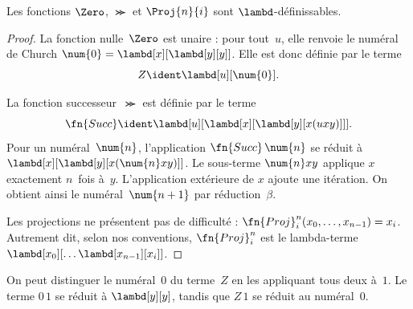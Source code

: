\documentclass[../../../include/open-logic-section]{subfiles}
\begin{document}

\begin{lem}
Les fonctions $\Zero$, $\Succ$ et $\Proj{n}{i}$ sont
$\lambd$-définissables.
\end{lem}

\begin{proof}
La fonction nulle~$\Zero$ est unaire : pour tout~$u$,
elle renvoie le numéral de Church
$\num{0}=\lambd[x][\lambd[y][y]]$.
Elle est donc définie par le terme
\[
Z\ident\lambd[u][\num{0}].
\]

La fonction successeur~$\Succ$ est définie par le terme
\[
\fn{Succ}\ident\lambd[u][\lambd[x][\lambd[y][x(uxy)]]].
\]
Pour un numéral~$\num{n}$, l'application
$\fn{Succ}\,\num{n}$ se réduit à
$\lambd[x][\lambd[y][x(\num{n}xy)]]$.
Le sous-terme $\num{n}xy$ applique $x$ exactement $n$~fois à~$y$.
L'application extérieure de $x$ ajoute une itération.
On obtient ainsi le numéral~$\num{n+1}$ par réduction~$\beta$.

Les projections ne présentent pas de difficulté :
$\fn{Proj}^n_i(x_0,\dots,x_{n-1})=x_i$.
Autrement dit, selon nos conventions,
$\fn{Proj}^n_i$ est le lambda-terme
$\lambd[x_0][\dots\lambd[x_{n-1}][x_i]]$.
\end{proof}

On peut distinguer le numéral~$\num{0}$ du terme~$Z$
en les appliquant tous deux à~$\num{1}$.
Le terme $\num{0}\,\num{1}$ se réduit à $\lambd[y][y]$,
tandis que $Z\,\num{1}$ se réduit au numéral~$\num{0}$.
\end{document}
